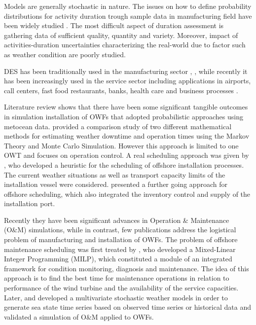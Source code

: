 Models are generally stochastic in nature. The issues on how to define probability distributions for activity duration trough sample data in manufacturing field have been widely studied \cite{fente2000defining, Maio2000, EJOR001}. The most difficult aspect of duration assessment is gathering data of sufficient quality, quantity and variety. Moreover, impact of activities-duration uncertainties characterizing the real-world due to factor such as weather condition are poorly studied.

DES has been traditionally used in the manufacturing sector \cite{KhedriLiraviasl20151490}, \cite{Yeong2014}, while recently it has been increasingly used in the service sector including applications in airports, call centers, fast food restaurants, banks, health care \cite{Chemweno201445} and business processes \cite{Khodyrev2014322}.

Literature review shows that there have been some significant tangible outcomes in simulation installation of OWFs that adopted probabilistic approaches using metocean data. \cite{Tyapin2011} provided a comparison study of two different mathematical methods for estimating weather downtime and operation times using the Markov Theory and Monte Carlo Simulation. However this approach is limited to one OWT and focuses on operation control. A real scheduling approach was given by \cite{Scholz2010}, who developed a heuristic for the scheduling of offshore installation processes. The current weather situations as well as transport capacity limits of the installation vessel were considered. \cite{ISOPE2012} presented a further going approach for offshore scheduling, which also integrated the inventory control and supply of the installation port.

Recently they have been significant advances in Operation \& Maintenance (O\&M) simulations, while in contrast, few publications address the logistical problem of manufacturing and installation of OWFs. The problem of offshore maintenance scheduling was first treated by \cite{Kovacs2011497}, who developed a Mixed-Linear Integer Programming (MILP), which constituted a module of an integrated framework for condition monitoring, diagnosis and maintenance. The idea of this approach is to find the best time for maintenance operations in relation to performance of the wind turbine and the availability of the service capacities. Later, \cite{scheu2012} and \cite{Hagen2013} developed a multivariate stochastic weather models in order to generate sea state time series based on observed time series or historical data and validated a simulation of O\&M applied to OWFs.

